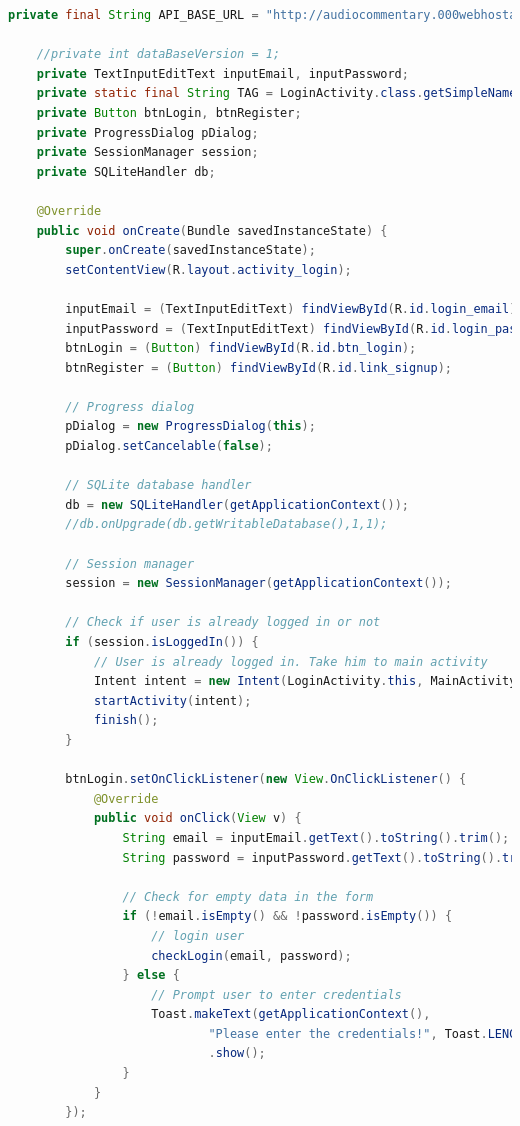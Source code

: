 \documentclass{article}
\begin{document}
\begin{landscape}
\begin{lstlisting}[language=Java,basicstyle=\tiny]
    private final String API_BASE_URL = "http://audiocommentary.000webhostapp.com";

    //private int dataBaseVersion = 1;
    private TextInputEditText inputEmail, inputPassword;
    private static final String TAG = LoginActivity.class.getSimpleName();
    private Button btnLogin, btnRegister;
    private ProgressDialog pDialog;
    private SessionManager session;
    private SQLiteHandler db;

    @Override
    public void onCreate(Bundle savedInstanceState) {
        super.onCreate(savedInstanceState);
        setContentView(R.layout.activity_login);

        inputEmail = (TextInputEditText) findViewById(R.id.login_email);
        inputPassword = (TextInputEditText) findViewById(R.id.login_password);
        btnLogin = (Button) findViewById(R.id.btn_login);
        btnRegister = (Button) findViewById(R.id.link_signup);

        // Progress dialog
        pDialog = new ProgressDialog(this);
        pDialog.setCancelable(false);

        // SQLite database handler
        db = new SQLiteHandler(getApplicationContext());
        //db.onUpgrade(db.getWritableDatabase(),1,1);

        // Session manager
        session = new SessionManager(getApplicationContext());

        // Check if user is already logged in or not
        if (session.isLoggedIn()) {
            // User is already logged in. Take him to main activity
            Intent intent = new Intent(LoginActivity.this, MainActivity.class);
            startActivity(intent);
            finish();
        }

        btnLogin.setOnClickListener(new View.OnClickListener() {
            @Override
            public void onClick(View v) {
                String email = inputEmail.getText().toString().trim();
                String password = inputPassword.getText().toString().trim();

                // Check for empty data in the form
                if (!email.isEmpty() && !password.isEmpty()) {
                    // login user
                    checkLogin(email, password);
                } else {
                    // Prompt user to enter credentials
                    Toast.makeText(getApplicationContext(),
                            "Please enter the credentials!", Toast.LENGTH_LONG)
                            .show();
                }
            }
        });


\end{lstlisting}
\end{landscape}
\end{document}
